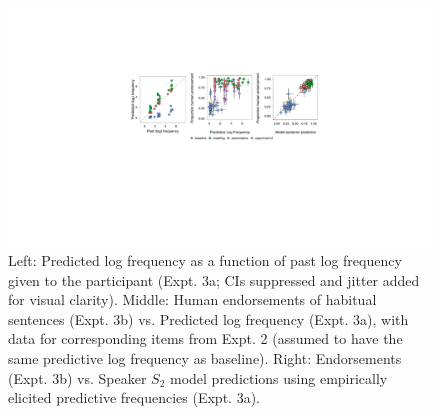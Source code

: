 \documentclass[10pt,letterpaper]{article}
\newcommand{\ndg}[1]{\textcolor{Green}{[ndg: #1]}}
\newcommand{\mht}[1]{\textcolor{DarkOrange}{[mht: #1]}}
\begin{document}



\begin{figure}[t]
\centering
  \includegraphics[width=\textwidth]{expt3-4-scatters-2.pdf}
  \caption{Left: Predicted log frequency as a function of past log frequency given to the participant (Expt. 3a; CIs suppressed and jitter added for visual clarity).
  Middle: Human endorsements of habitual sentences (Expt. 3b) vs. Predicted log frequency (Expt. 3a), with data for corresponding items from Expt. 2 (assumed to have the same predictive log frequency as baseline). 
  Right: Endorsements (Expt. 3b) vs. Speaker $S_2$ model predictions using empirically elicited predictive frequencies (Expt. 3a).}
  \label{fig:tj3}
\end{figure}
\end{document}
